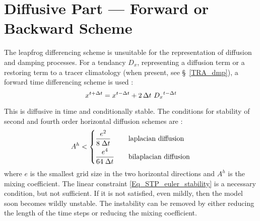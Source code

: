 \documentclass[NEMO_book]{subfiles}
\begin{document}
\section{Diffusive Part --- Forward or Backward Scheme}
\label{STP_forward_imp}

The leapfrog differencing scheme is unsuitable for the representation of 
diffusion and damping processes. For a tendancy $D_x$, representing a 
diffusion term or a restoring term to a tracer climatology 
(when present, see \S~\ref{TRA_dmp}), a forward time differencing scheme
 is used :
\begin{equation} \label{Eq_STP_euler}
   x^{t+\Delta t} = x^{t-\Delta t} + 2 \, \Delta t \ {D_x}^{t-\Delta t}
\end{equation} 

This is diffusive in time and conditionally stable. The 
conditions for stability of second and fourth order horizontal diffusion schemes are \citep{Griffies_Bk04}:
\begin{equation} \label{Eq_STP_euler_stability}
A^h < \left\{
\begin{aligned}
                    &\frac{e^2}{  8 \; \Delta t } 	&&\quad \text{laplacian diffusion} 	\\
                    &\frac{e^4}{64 \; \Delta t } 	&&\quad \text{bilaplacian diffusion} 
            \end{aligned}
\right.
\end{equation}
where $e$ is the smallest grid size in the two horizontal directions and $A^h$ is 
the mixing coefficient. The linear constraint \eqref{Eq_STP_euler_stability} 
is a necessary condition, but not sufficient. If it is not satisfied, even mildly, 
then the model soon becomes wildly unstable. The instability can be removed 
by either reducing the length of the time steps or reducing the mixing coefficient.
\end{document}
